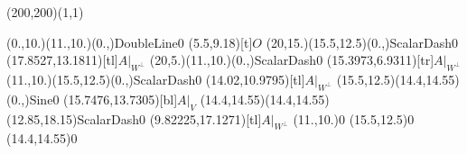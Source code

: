 \unitlength=1bp%

\begin{feynartspicture}(200,200)(1,1)

\FADiagram{}
\FAProp(0.,10.)(11.,10.)(0.,){DoubleLine}{0}
\FALabel(5.5,9.18)[t]{$O$}
\FAProp(20,15.)(15.5,12.5)(0.,){ScalarDash}{0}
\FALabel(17.8527,13.1811)[tl]{$A|_{W^\perp}$}
\FAProp(20,5.)(11.,10.)(0.,){ScalarDash}{0}
\FALabel(15.3973,6.9311)[tr]{$A|_{W^\perp}$}
\FAProp(11.,10.)(15.5,12.5)(0.,){ScalarDash}{0}
\FALabel(14.02,10.9795)[tl]{$A|_{W^\perp}$}
\FAProp(15.5,12.5)(14.4,14.55)(0.,){Sine}{0}
\FALabel(15.7476,13.7305)[bl]{$A|_V$}
\FAProp(14.4,14.55)(14.4,14.55)(12.85,18.15){ScalarDash}{0}
\FALabel(9.82225,17.1271)[tl]{$A|_{W^\perp}$}
\FAVert(11.,10.){0}
\FAVert(15.5,12.5){0}
\FAVert(14.4,14.55){0}
\end{feynartspicture}

